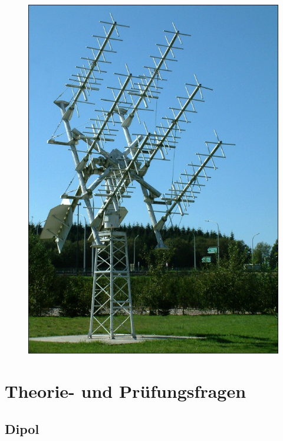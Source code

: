 \begin{figure}
 \vspace{-6cm}
  \includegraphics[scale=0.2]{Antennen/Bilder/Kreuzdipolarp.jpg}
 \vspace{-6cm}
\end{figure}

\section*{Theorie- und Prüfungsfragen}

\subsection*{Dipol}

